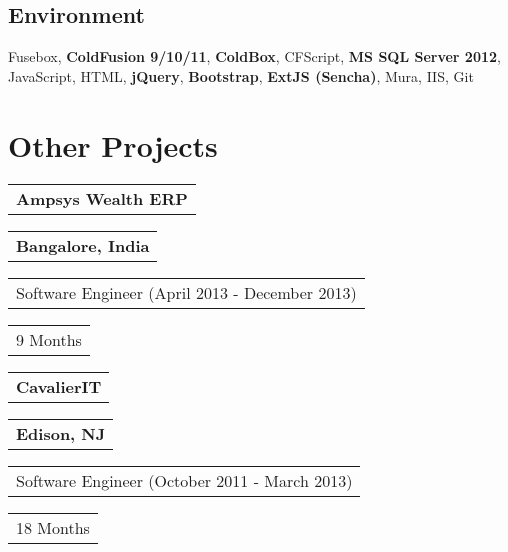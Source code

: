 \documentclass[letterpaper,11pt]{article}
\begin{document}
    \subsection{Environment}
    Fusebox, \textbf{ColdFusion 9/10/11}, \textbf{ColdBox}, CFScript, \textbf{MS SQL Server 2012}, JavaScript, HTML, \textbf{jQuery}, \textbf{Bootstrap}, \textbf{ExtJS (Sencha)}, Mura, IIS, Git


    \section{Other Projects}


    \begin{tabular}[t]{@{}l}
    \textbf{Ampsys Wealth ERP}
    \end{tabular}
    \hfill
    \begin{tabular}[t]{l@{}}
    \textbf{Bangalore, India}
    \end{tabular}
    \noindent\newline
    \begin{tabular}[t]{@{}l}
    Software Engineer (April 2013 - December 2013)
    \end{tabular}
    \hfill
    \begin{tabular}[t]{l@{}}
    9 Months
    \end{tabular}


    \vspace{0.25cm}
    \noindent
    \begin{tabular}[t]{@{}l}
    \textbf{CavalierIT}
    \end{tabular}
    \hfill
    \begin{tabular}[t]{l@{}}
    \textbf{Edison, NJ}
    \end{tabular}
    \noindent\newline
    \begin{tabular}[t]{@{}l}
    Software Engineer (October 2011 - March 2013)
    \end{tabular}
    \hfill
    \begin{tabular}[t]{l@{}}
    18 Months
    \end{tabular}
\end{document}
